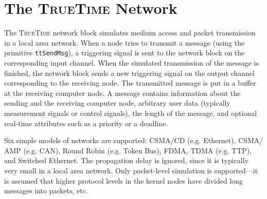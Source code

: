 \documentclass[final,twoside]{rapport}
\begin{document}
\section{The \textsc{TrueTime} Network}

The \textsc{TrueTime} network block simulates medium access and packet
transmission in a local area network. When a node tries to transmit a
message (using the primitive \texttt{ttSendMsg}), a triggering signal
is sent to the network block on the corresponding input channel. When
the simulated transmission of the message is finished, the network
block sends a new triggering signal on the output channel
corresponding to the receiving node. The transmitted message is put in
a buffer at the receiving computer node. A message contains
information about the sending and the receiving computer node,
arbitrary user data (typically measurement signals or control
signals), the length of the message, and optional real-time attributes
such as a priority or a deadline.

Six simple models of networks are supported: CSMA/CD (e.g. Ethernet),
CSMA/ AMP (e.g. CAN), Round Robin (e.g. Token Bus), FDMA, TDMA (e.g.
TTP), and Switched Ethernet. The propagation delay is ignored, since
it is typically very small in a local area network. Only packet-level
simulation is supported---it is assumed that higher protocol levels in
the kernel nodes have divided long messages into packets, etc.
\end{document}
